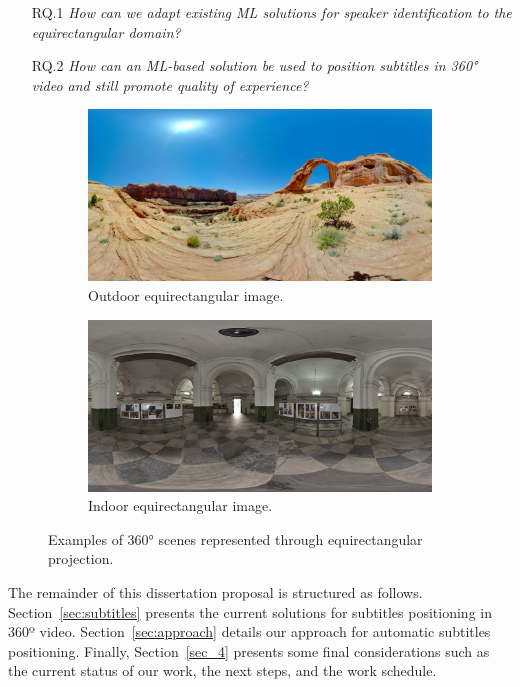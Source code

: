 \begin{itemize}
    \item[RQ.1] \emph{How can we adapt existing ML solutions for speaker identification to the equirectangular domain?}
    \item[RQ.2] \emph{How can an ML-based solution be used to position subtitles in 360° video and still promote quality of experience?}
\end{itemize}

\begin{figure}[!ht]
\centering
    \begin{subfigure}{0.47\linewidth}
        \centering
        \includegraphics[width=1\textwidth]{img/image (9).jpg}
        \caption{Outdoor equirectangular image.}
        \label{subfig:out_equi}
    \end{subfigure}\hfill
    \begin{subfigure}{0.47\linewidth}
        \centering
        \includegraphics[width=1\textwidth]{img/image (10).JPG}
        \caption{Indoor equirectangular image.}
        \label{subfig:in_equi}
    \end{subfigure}

\caption{Examples of 360° scenes represented through equirectangular projection.}
\label{fig:equirectangular_proj}
\end{figure}

The remainder of this dissertation proposal is structured as follows. Section~\ref{sec:subtitles} presents the current solutions for subtitles positioning in 360º video. Section~\ref{sec:approach} details our approach for automatic subtitles positioning. Finally, Section~\ref{sec_4} presents some final considerations such as the current status of our work, the next steps, and the work schedule.